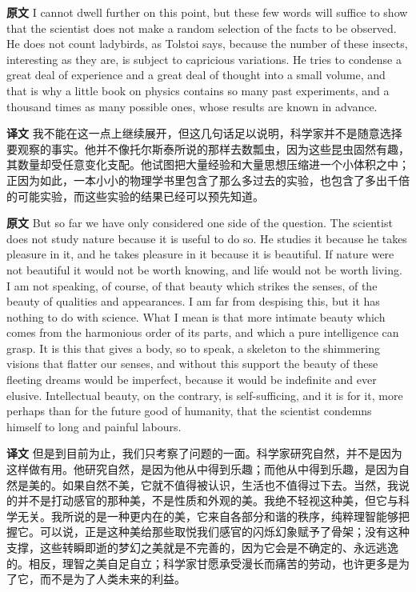 \documentclass[UTF8]{ctexart}
\newenvironment{english}{\par\small\noindent\textbf{原文}\quad\ignorespaces}{\par}
\newenvironment{zhtranslation}{\par\noindent\textbf{译文}\quad\ignorespaces}{\par\vspace{0.35em}}
\begin{document}
\begin{english}
I cannot dwell further on this point, but these few words will suffice to show that the scientist does not make a random selection of the facts to be observed. He does not count ladybirds, as Tolstoi says, because the number of these insects, interesting as they are, is subject to capricious variations. He tries to condense a great deal of experience and a great deal of thought into a small volume, and that is why a little book on physics contains so many past experiments, and a thousand times as many possible ones, whose results are known in advance.
\end{english}
\begin{zhtranslation}
我不能在这一点上继续展开，但这几句话足以说明，科学家并不是随意选择要观察的事实。他并不像托尔斯泰所说的那样去数瓢虫，因为这些昆虫固然有趣，其数量却受任意变化支配。他试图把大量经验和大量思想压缩进一个小体积之中；正因为如此，一本小小的物理学书里包含了那么多过去的实验，也包含了多出千倍的可能实验，而这些实验的结果已经可以预先知道。\end{zhtranslation}

\begin{english}
But so far we have only considered one side of the question. The scientist does not study nature because it is useful to do so. He studies it because he takes pleasure in it, and he takes pleasure in it because it is beautiful. If nature were not beautiful it would not be worth knowing, and life would not be worth living. I am not speaking, of course, of that beauty which strikes the senses, of the beauty of qualities and appearances. I am far from despising this, but it has nothing to do with science. What I mean is that more intimate beauty which comes from the harmonious order of its parts, and which a pure intelligence can grasp. It is this that gives a body, so to speak, a skeleton to the shimmering visions that flatter our senses, and without this support the beauty of these fleeting dreams would be imperfect, because it would be indefinite and ever elusive. Intellectual beauty, on the contrary, is self-sufficing, and it is for it, more perhaps than for the future good of humanity, that the scientist condemns himself to long and painful labours.
\end{english}
\begin{zhtranslation}
但是到目前为止，我们只考察了问题的一面。科学家研究自然，并不是因为这样做有用。他研究自然，是因为他从中得到乐趣；而他从中得到乐趣，是因为自然是美的。如果自然不美，它就不值得被认识，生活也不值得过下去。当然，我说的并不是打动感官的那种美，不是性质和外观的美。我绝不轻视这种美，但它与科学无关。我所说的是一种更内在的美，它来自各部分和谐的秩序，纯粹理智能够把握它。可以说，正是这种美给那些取悦我们感官的闪烁幻象赋予了骨架；没有这种支撑，这些转瞬即逝的梦幻之美就是不完善的，因为它会是不确定的、永远逃逸的。相反，理智之美自足自立；科学家甘愿承受漫长而痛苦的劳动，也许更多是为了它，而不是为了人类未来的利益。\end{zhtranslation}
\end{document}
